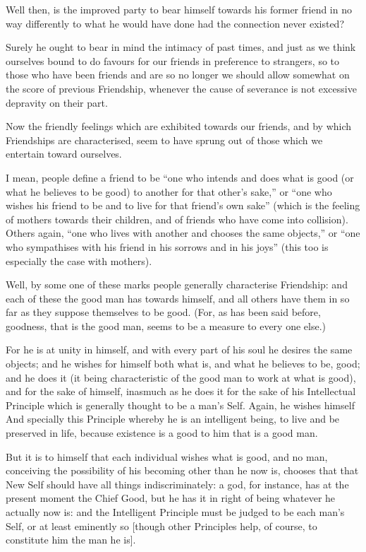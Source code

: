 Well then, is the improved party to bear himself towards his former friend in
no way differently to what he would have done had the connection never existed?

Surely he ought to bear in mind the intimacy of past times, and just as we
think ourselves bound to do favours for our friends in preference to strangers,
so to those who have been friends and are so no longer we should allow somewhat
on the score of previous Friendship, whenever the cause of severance is not
excessive depravity on their part.


Now the friendly feelings which are exhibited towards our friends, and by which
Friendships are characterised, seem to have sprung out of those which we
entertain toward ourselves.

I mean, people define a friend to be “one who intends and does what is
good (or what he believes to be good) to another for that other’s
sake,” or “one who wishes his friend to be and to live for that
friend’s own sake” (which is the feeling of mothers towards their
children, and of friends who have come into collision). Others again,
“one who lives with another and chooses the same objects,” or
“one who sympathises with his friend in his sorrows and in his
joys” (this too is especially the case with mothers).

Well, by some one of these marks people generally characterise Friendship: and
each of these the good man has towards himself, and all others have them in so
far as they suppose themselves to be good. (For, as has been said before,
goodness, that is the good man, seems to be a measure to every one else.)

For he is at unity in himself, and with every part of his soul he desires the
same objects; and he wishes for himself both what is, and what he believes to
be, good; and he does it (it being characteristic of the good man to work at
what is good), and for the sake of himself, inasmuch as he does it for the sake
of his Intellectual Principle which is generally thought to be a man’s
Self. Again, he wishes himself And specially this Principle whereby he is an
intelligent being, to live and be preserved in life, because existence is a
good to him that is a good man.

But it is to himself that each individual wishes what is good, and no man,
conceiving the possibility of his becoming other than he now is, chooses that
that New Self should have all things indiscriminately: a god, for instance, has
at the present moment the Chief Good, but he has it in right of being whatever
he actually now is: and the Intelligent Principle must be judged to be each
man’s Self, or at least eminently so [though other Principles help, of
course, to constitute him the man he is].

